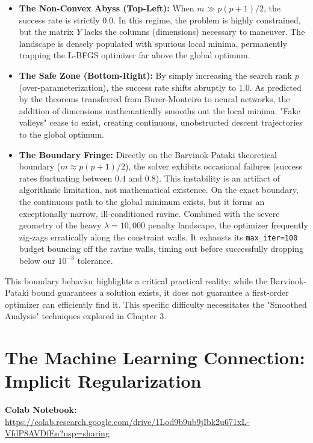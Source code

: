 \begin{itemize}
    \item \textbf{The Non-Convex Abyss (Top-Left):} When $m \gg p(p+1)/2$, the success rate is strictly $0.0$. In this regime, the problem is highly constrained, but the matrix $Y$ lacks the columns (dimensions) necessary to maneuver. The landscape is densely populated with spurious local minima, permanently trapping the L-BFGS optimizer far above the global optimum.
    
    \item \textbf{The Safe Zone (Bottom-Right):} By simply increasing the search rank $p$ (over-parameterization), the success rate shifts abruptly to $1.0$. As predicted by the theorems transferred from Burer-Monteiro to neural networks, the addition of dimensions mathematically smooths out the local minima. "Fake valleys" cease to exist, creating continuous, unobstructed descent trajectories to the global optimum.
    
    \item \textbf{The Boundary Fringe:} Directly on the Barvinok-Pataki theoretical boundary ($m \approx p(p+1)/2$), the solver exhibits occasional failures (success rates fluctuating between $0.4$ and $0.8$). This instability is an artifact of algorithmic limitation, not mathematical existence. On the exact boundary, the continuous path to the global minimum exists, but it forms an exceptionally narrow, ill-conditioned ravine. Combined with the severe geometry of the heavy $\lambda = 10,000$ penalty landscape, the optimizer frequently zig-zags erratically along the constraint walls. It exhausts its \texttt{max\_iter=100} budget bouncing off the ravine walls, timing out before successfully dropping below our $10^{-3}$ tolerance. 
\end{itemize}

This boundary behavior highlights a critical practical reality: while the Barvinok-Pataki bound guarantees a solution exists, it does not guarantee a first-order optimizer can efficiently find it. This specific difficulty necessitates the "Smoothed Analysis" techniques explored in Chapter 3.

\section{The Machine Learning Connection: Implicit Regularization}

\textbf{Colab Notebook:} \url{https://colab.research.google.com/drive/1Lod9b9ub9jIbk2u671xL-VfdP8AVDfEn?usp=sharing}

